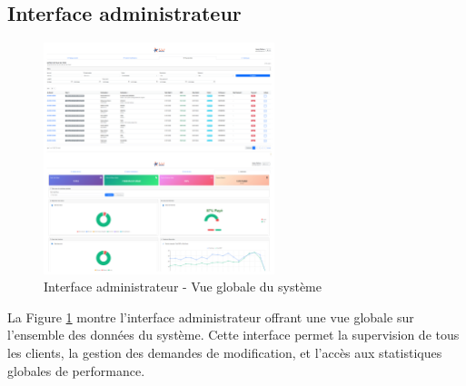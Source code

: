 \subsection{Interface administrateur}

\begin{figure}[H]
\centering
\includegraphics[width=0.6\textwidth]{images/admin_interface.png}
\caption{Interface administrateur - Vue globale du système}
\label{fig:admin_interface}
\end{figure}

La Figure \ref{fig:admin_interface} montre l'interface administrateur offrant une vue globale sur l'ensemble des données du système. Cette interface permet la supervision de tous les clients, la gestion des demandes de modification, et l'accès aux statistiques globales de performance.